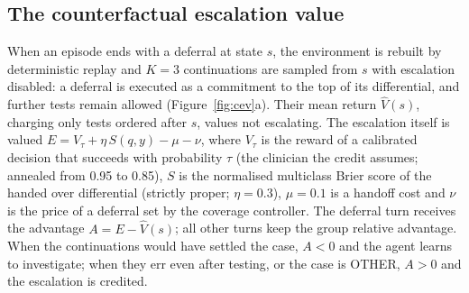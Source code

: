 \documentclass[11pt]{article}
\begin{document}
\subsection*{The counterfactual escalation value}
When an episode ends with a deferral at state $s$, the environment is rebuilt by deterministic replay and $K = 3$ continuations are sampled from $s$ with escalation disabled: a deferral is executed as a commitment to the top of its differential, and further tests remain allowed (Figure~\ref{fig:cev}a). Their mean return $\hat V(s)$, charging only tests ordered after $s$, values not escalating. The escalation itself is valued $E = V_\tau + \eta\,S(q, y) - \mu - \nu$, where $V_\tau$ is the reward of a calibrated decision that succeeds with probability $\tau$ (the clinician the credit assumes; annealed from 0.95 to 0.85), $S$ is the normalised multiclass Brier score of the handed over differential (strictly proper; $\eta = 0.3$), $\mu = 0.1$ is a handoff cost and $\nu$ is the price of a deferral set by the coverage controller. The deferral turn receives the advantage $A = E - \hat V(s)$; all other turns keep the group relative advantage. When the continuations would have settled the case, $A < 0$ and the agent learns to investigate; when they err even after testing, or the case is OTHER, $A > 0$ and the escalation is credited.
\end{document}
